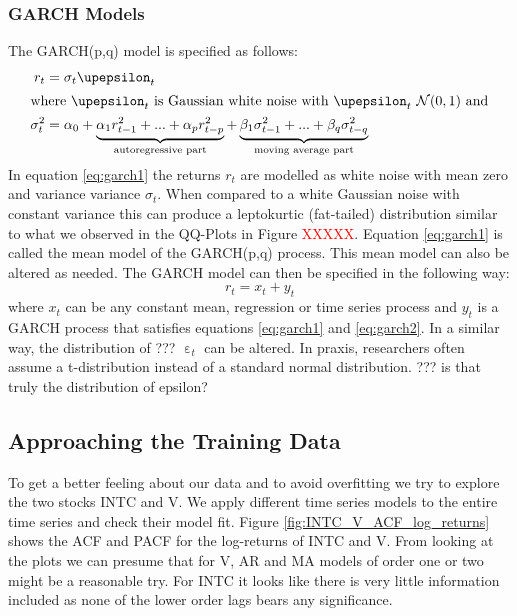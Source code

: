 \subsubsection{GARCH Models}
The GARCH(p,q) model is specified as follows:
\begin{align}
    r_{t} &= \sigma_t  \upepsilon_t \label{eq:garch1}\\
\intertext{where $\upepsilon_t$ is Gaussian white noise with  $\upepsilon_t ~ \mathcal{N}(0,1)$ and}
    \sigma^2_t &= \alpha_0 + \underbrace{\alpha_1 r^2_{t-1} + ... + \alpha_p r^2_{t-p}}_\text{autoregressive part} + \underbrace{\beta_1 \sigma^2_{t-1} + ... + \beta_q \sigma^2_{t-q}}_\text{moving average part} \label{eq:garch2}
\end{align}{}
In equation \ref{eq:garch1} the returns $r_t$ are modelled as white noise with mean zero and variance variance $\sigma_t$. When compared to a white Gaussian noise with constant variance this can produce a leptokurtic (fat-tailed) distribution similar to what we observed in the QQ-Plots in Figure \textcolor{red}{XXXXX}. Equation \ref{eq:garch1} is called the mean model of the GARCH(p,q) process. This mean model can also be altered as needed. The GARCH model can then be specified in the following way: 
\begin{equation}
    r_t = x_t + y_t
\end{equation}{}
where $x_t$ can be any constant mean, regression or time series process and $y_t$ is a GARCH process that satisfies equations \ref{eq:garch1} and \ref{eq:garch2}. In a similar way, the distribution of ??? $\upepsilon_t$ can be altered. In praxis, researchers often assume a t-distribution instead of a standard normal distribution. ??? is that truly the distribution of epsilon?



\subsection{Approaching the Training Data}
To get a better feeling about our data and to avoid overfitting we try to explore the two stocks INTC and V. We apply different time series models to the entire time series and check their model fit. Figure \ref{fig:INTC_V_ACF_log_returns} shows the ACF and PACF for the log-returns of INTC and V. From looking at the plots we can presume that for V, AR and MA models of order one or two might be a reasonable try. For INTC it looks like there is very little information included as none of the lower order lags bears any significance. 

